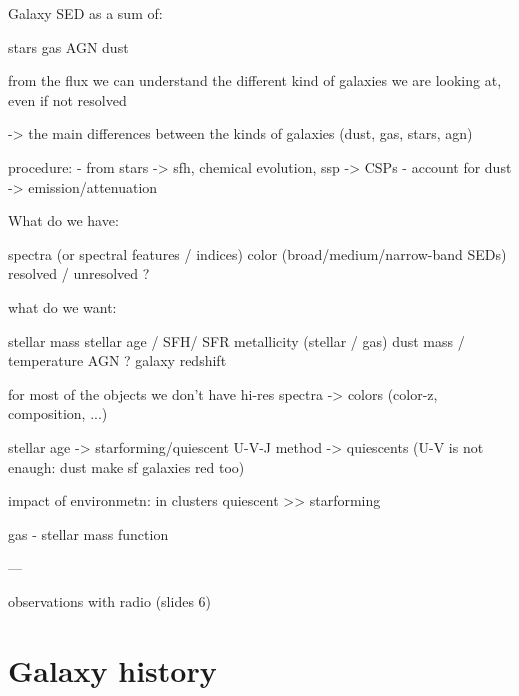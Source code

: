 Galaxy SED as a sum of:

stars
gas
AGN
dust

from the flux we can understand the different kind of galaxies we are looking at, even if not resolved

-> the main differences between the kinds of galaxies (dust, gas, stars, agn)

procedure:
- from stars -> sfh, chemical evolution, ssp -> CSPs
- account for dust -> emission/attenuation


What do we have:

    spectra (or spectral features / indices)
    color (broad/medium/narrow-band SEDs)
    resolved / unresolved ?

what do we want:

    stellar mass
    stellar age / SFH/ SFR
    metallicity (stellar / gas)
    dust mass / temperature
    AGN ?
    galaxy redshift

for most of the objects we don't have hi-res spectra -> colors (color-z, composition, ...)

stellar age -> starforming/quiescent
U-V-J method -> quiescents (U-V is not enaugh: dust make sf galaxies red too)

impact of environmetn: in clusters quiescent >> starforming

gas - stellar mass function

---

observations with radio (slides 6)


\chapter{Galaxy history} %






